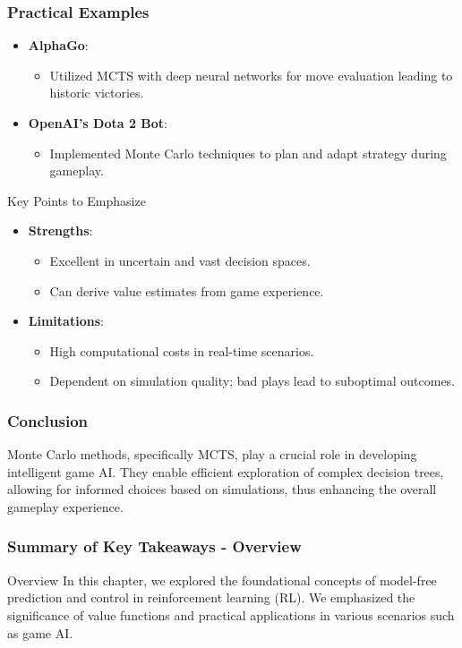 \documentclass[aspectratio=169]{beamer}
\begin{document}
\begin{frame}[fragile]
  \frametitle{Practical Examples}
  \begin{itemize}
    \item \textbf{AlphaGo}:
      \begin{itemize}
        \item Utilized MCTS with deep neural networks for move evaluation leading to historic victories.
      \end{itemize}
      
    \item \textbf{OpenAI’s Dota 2 Bot}:
      \begin{itemize}
        \item Implemented Monte Carlo techniques to plan and adapt strategy during gameplay.
      \end{itemize}
  \end{itemize}

  \begin{block}{Key Points to Emphasize}
    \begin{itemize}
      \item \textbf{Strengths}:
        \begin{itemize}
          \item Excellent in uncertain and vast decision spaces.
          \item Can derive value estimates from game experience.
        \end{itemize}
      \item \textbf{Limitations}:
        \begin{itemize}
          \item High computational costs in real-time scenarios.
          \item Dependent on simulation quality; bad plays lead to suboptimal outcomes.
        \end{itemize}
    \end{itemize}
  \end{block}
\end{frame}

\begin{frame}[fragile]
  \frametitle{Conclusion}
  Monte Carlo methods, specifically MCTS, play a crucial role in developing intelligent game AI. They enable efficient exploration of complex decision trees, allowing for informed choices based on simulations, thus enhancing the overall gameplay experience.
\end{frame}

\begin{frame}[fragile]
    \frametitle{Summary of Key Takeaways - Overview}
    \begin{block}{Overview}
        In this chapter, we explored the foundational concepts of model-free prediction and control in reinforcement learning (RL). 
        We emphasized the significance of value functions and practical applications in various scenarios such as game AI.
    \end{block}
\end{frame}
\end{document}
